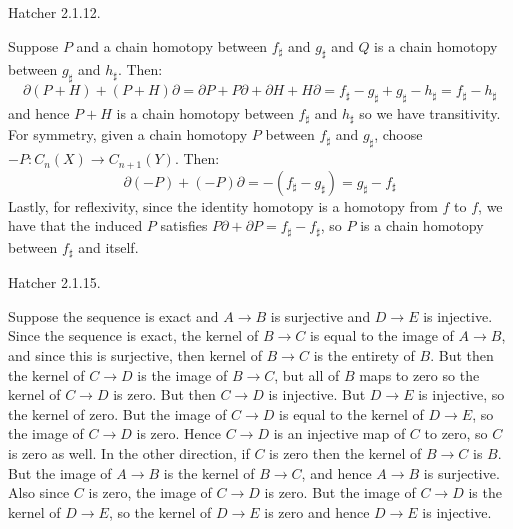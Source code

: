     \begin{problem}
        Hatcher 2.1.12.
    \end{problem}
    \begin{solution}
        Suppose $P$ and a chain homotopy between $f_{\sharp}$ and $g_{\sharp}$
        and $Q$ is a chain homotopy between $g_{\sharp}$ and $h_{\sharp}$.
        Then:
        \begin{equation}
            \partial(P+H)+(P+H)\partial
            =\partial{P}+P\partial+\partial{H}+H\partial
            =f_{\sharp}-g_{\sharp}+g_{\sharp}-h_{\sharp}
            =f_{\sharp}-h_{\sharp}
        \end{equation}
        and hence $P+H$ is a chain homotopy between $f_{\sharp}$ and
        $h_{\sharp}$ so we have transitivity. For symmetry, given a chain
        homotopy $P$ between $f_{\sharp}$ and $g_{\sharp}$, choose
        $\minus{P}:C_{n}(X)\rightarrow{C}_{n+1}(Y)$. Then:
        \begin{equation}
            \partial(\minus{P})+(\minus{P})\partial
            =\minus(f_{\sharp}-g_{\sharp})=g_{\sharp}-f_{\sharp}
        \end{equation}
        Lastly, for reflexivity, since the identity homotopy is a homotopy from
        $f$ to $f$, we have that the induced $P$ satisfies
        $P\partial+\partial{P}=f_{\sharp}-f_{\sharp}$, so $P$ is a chain
        homotopy between $f_{\sharp}$ and itself.
    \end{solution}
    \begin{problem}
        Hatcher 2.1.15.
    \end{problem}
    \begin{solution}
        Suppose the sequence is exact and $A\rightarrow{B}$ is surjective and
        $D\rightarrow{E}$ is injective. Since the sequence is exact, the kernel
        of $B\rightarrow{C}$ is equal to the image of $A\rightarrow{B}$, and
        since this is surjective, then kernel of $B\rightarrow{C}$ is the
        entirety of $B$. But then the kernel of $C\rightarrow{D}$ is the image
        of $B\rightarrow{C}$, but all of $B$ maps to zero so the kernel of
        $C\rightarrow{D}$ is zero. But then $C\rightarrow{D}$ is injective. But
        $D\rightarrow{E}$ is injective, so
        the kernel of zero. But the image of $C\rightarrow{D}$ is equal to the
        kernel of $D\rightarrow{E}$, so the image of $C\rightarrow{D}$ is zero.
        Hence $C\rightarrow{D}$ is an injective map of $C$ to zero, so $C$ is
        zero as well. In the other direction, if $C$ is zero then the kernel of
        $B\rightarrow{C}$ is $B$. But the image of $A\rightarrow{B}$ is the
        kernel of $B\rightarrow{C}$, and hence $A\rightarrow{B}$ is surjective.
        Also since $C$ is zero, the image of $C\rightarrow{D}$ is zero. But the
        image of $C\rightarrow{D}$ is the kernel of $D\rightarrow{E}$, so the
        kernel of $D\rightarrow{E}$ is zero and hence $D\rightarrow{E}$ is
        injective.
    \end{solution}
